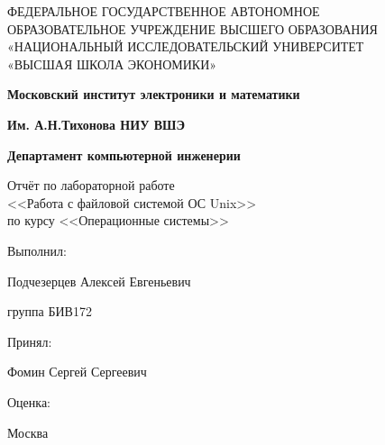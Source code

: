 \begin{titlepage}
	\begin{center}
		ФЕДЕРАЛЬНОЕ  ГОСУДАРСТВЕННОЕ АВТОНОМНОЕ \\
		ОБРАЗОВАТЕЛЬНОЕ УЧРЕЖДЕНИЕ ВЫСШЕГО ОБРАЗОВАНИЯ\\
		«НАЦИОНАЛЬНЫЙ ИССЛЕДОВАТЕЛЬСКИЙ УНИВЕРСИТЕТ\\
		«ВЫСШАЯ ШКОЛА ЭКОНОМИКИ»
	\end{center}
	
	\begin{center}
		\textbf{Московский институт электроники и математики}
		
		\textbf{Им. А.Н.Тихонова НИУ ВШЭ}
		
		\textbf{Департамент компьютерной инженерии}
	\end{center}	
	\vspace{6ex}
	\begin{center}
	Отчёт по лабораторной работе \\
	<<Работа с файловой системой ОС Unix>> \\ 
	 по курсу <<Операционные системы>>
	\end{center}	
	\vspace{5ex}
	
	Выполнил:
	
	Подчезерцев Алексей Евгеньевич 
	
	группа БИВ172
	
	\vspace{5ex}
	
	Принял:
	
	Фомин Сергей Сергеевич 
	
	\vspace{5ex}
	
	Оценка:


	\vfill
	\begin{center}
		Москва \the\year
	\end{center}
\end{titlepage}